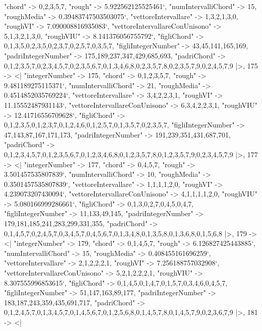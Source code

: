 \documentclass[
]{article}
\begin{document}
\begin{DatasetVerbatim}
    "chord" -> {0,2,3,5,7},
    "rough" -> 5.922562125525461`,
    "numIntervalliChord" -> 15,
    "roughMedia" -> 0.39483747503503075`,
    "vettoreIntervallare" -> {1,3,2,1,3,0},
    "roughVI" -> 7.090008816935083`,
    "vettoreIntervallareConUnisono" -> {5,1,3,2,1,3,0},
    "roughVIU" -> 8.141376056755792`,
    "figliChord" -> {{0,1,3,5},{0,2,3,5},{0,2,3,7},{0,2,5,7},{0,3,5,7}},
    "figliIntegerNumber" -> {43,45,141,165,169},
    "padriIntegerNumber" -> {175,189,237,347,429,685,693},
    "padriChord" -> {{0,1,2,3,5,7},{0,2,3,4,5,7},{0,2,3,5,6,7},{0,1,3,4,6,8},{0,2,3,5,7,8},{0,2,3,5,7,9},{0,2,4,5,7,9}}
  |>,
  175 -> <|
    "integerNumber" -> 175,
    "chord" -> {0,1,2,3,5,7},
    "rough" -> 9.481189275115371`,
    "numIntervalliChord" -> 21,
    "roughMedia" -> 0.4514852035769224`,
    "vettoreIntervallare" -> {3,4,2,2,3,1},
    "roughVI" -> 11.15552487931143`,
    "vettoreIntervallareConUnisono" -> {6,3,4,2,2,3,1},
    "roughVIU" -> 12.41716556709628`,
    "figliChord" -> {{0,1,2,3,5},{0,1,2,3,7},{0,1,2,4,6},{0,1,2,5,7},{0,1,3,5,7},{0,2,3,5,7}},
    "figliIntegerNumber" -> {47,143,87,167,171,173},
    "padriIntegerNumber" -> {191,239,351,431,687,701},
    "padriChord" -> {{0,1,2,3,4,5,7},{0,1,2,3,5,6,7},{0,1,2,3,4,6,8},{0,1,2,3,5,7,8},{0,1,2,3,5,7,9},{0,2,3,4,5,7,9}}
  |>,
  177 -> <|
    "integerNumber" -> 177,
    "chord" -> {0,4,5,7},
    "rough" -> 3.501457535807839`,
    "numIntervalliChord" -> 10,
    "roughMedia" -> 0.3501457535807839`,
    "vettoreIntervallare" -> {1,1,1,1,2,0},
    "roughVI" -> 4.239073207430094`,
    "vettoreIntervallareConUnisono" -> {4,1,1,1,1,2,0},
    "roughVIU" -> 5.080166999286661`,
    "figliChord" -> {{0,1,3},{0,2,7},{0,4,5},{0,4,7}},
    "figliIntegerNumber" -> {11,133,49,145},
    "padriIntegerNumber" -> {179,181,185,241,283,299,331,355},
    "padriChord" -> {{0,1,4,5,7},{0,2,4,5,7},{0,3,4,5,7},{0,4,5,6,7},{0,1,3,4,8},{0,1,3,5,8},{0,1,3,6,8},{0,1,5,6,8}}
  |>,
  179 -> <|
    "integerNumber" -> 179,
    "chord" -> {0,1,4,5,7},
    "rough" -> 6.126827425443885`,
    "numIntervalliChord" -> 15,
    "roughMedia" -> 0.408455161696259`,
    "vettoreIntervallare" -> {2,1,2,2,2,1},
    "roughVI" -> 7.256188757032908`,
    "vettoreIntervallareConUnisono" -> {5,2,1,2,2,2,1},
    "roughVIU" -> 8.307555996853615`,
    "figliChord" -> {{0,1,4,5},{0,1,4,7},{0,1,5,7},{0,3,4,6},{0,4,5,7}},
    "figliIntegerNumber" -> {51,147,163,89,177},
    "padriIntegerNumber" -> {183,187,243,359,435,691,717},
    "padriChord" -> {{0,1,2,4,5,7},{0,1,3,4,5,7},{0,1,4,5,6,7},{0,1,2,5,6,8},{0,1,4,5,7,8},{0,1,4,5,7,9},{0,2,3,6,7,9}}
  |>,
  181 -> <|

\end{DatasetVerbatim}
\end{document}
